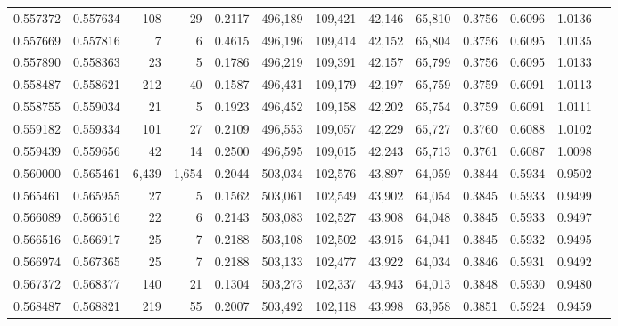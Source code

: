 \begin{tabular}{rrrrrrrrrrrrr}
0.557372 & 0.557634 &    108 &    29 &                                     0.2117 & 496,189 & 109,421 &  42,146 &  65,810 & 0.3756 & 0.6096 & 1.0136 \\
0.557669 & 0.557816 &      7 &     6 &                                     0.4615 & 496,196 & 109,414 &  42,152 &  65,804 & 0.3756 & 0.6095 & 1.0135 \\
0.557890 & 0.558363 &     23 &     5 &                                     0.1786 & 496,219 & 109,391 &  42,157 &  65,799 & 0.3756 & 0.6095 & 1.0133 \\
0.558487 & 0.558621 &    212 &    40 &                                     0.1587 & 496,431 & 109,179 &  42,197 &  65,759 & 0.3759 & 0.6091 & 1.0113 \\
0.558755 & 0.559034 &     21 &     5 &                                     0.1923 & 496,452 & 109,158 &  42,202 &  65,754 & 0.3759 & 0.6091 & 1.0111 \\
0.559182 & 0.559334 &    101 &    27 &                                     0.2109 & 496,553 & 109,057 &  42,229 &  65,727 & 0.3760 & 0.6088 & 1.0102 \\
0.559439 & 0.559656 &     42 &    14 &                                     0.2500 & 496,595 & 109,015 &  42,243 &  65,713 & 0.3761 & 0.6087 & 1.0098 \\
0.560000 & 0.565461 &  6,439 & 1,654 &                                     0.2044 & 503,034 & 102,576 &  43,897 &  64,059 & 0.3844 & 0.5934 & 0.9502 \\
0.565461 & 0.565955 &     27 &     5 &                                     0.1562 & 503,061 & 102,549 &  43,902 &  64,054 & 0.3845 & 0.5933 & 0.9499 \\
0.566089 & 0.566516 &     22 &     6 &                                     0.2143 & 503,083 & 102,527 &  43,908 &  64,048 & 0.3845 & 0.5933 & 0.9497 \\
0.566516 & 0.566917 &     25 &     7 &                                     0.2188 & 503,108 & 102,502 &  43,915 &  64,041 & 0.3845 & 0.5932 & 0.9495 \\
0.566974 & 0.567365 &     25 &     7 &                                     0.2188 & 503,133 & 102,477 &  43,922 &  64,034 & 0.3846 & 0.5931 & 0.9492 \\
0.567372 & 0.568377 &    140 &    21 &                                     0.1304 & 503,273 & 102,337 &  43,943 &  64,013 & 0.3848 & 0.5930 & 0.9480 \\
0.568487 & 0.568821 &    219 &    55 &                                     0.2007 & 503,492 & 102,118 &  43,998 &  63,958 & 0.3851 & 0.5924 & 0.9459 \\

\end{tabular}
